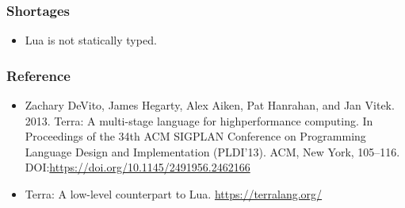 \documentclass{beamer}
\begin{document}
\begin{frame}
	\frametitle{Shortages}
  \begin{itemize}
  \item Lua is not statically typed.
  \end{itemize}
\end{frame}

\begin{frame}
	\frametitle{Reference}
  \begin{itemize}
  \item Zachary DeVito, James Hegarty, Alex Aiken, Pat Hanrahan, and Jan Vitek. 2013. Terra: A multi-stage language for highperformance computing. In Proceedings of the 34th ACM SIGPLAN Conference on Programming Language Design and Implementation (PLDI’13). ACM, New York, 105–116. DOI:\url{https://doi.org/10.1145/2491956.2462166}
  \item Terra: A low-level counterpart to Lua. \url{https://terralang.org/}
  \end{itemize}
\end{frame}
\end{document}
